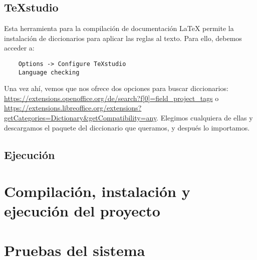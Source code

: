 \subsection{\TeX studio}
Esta herramienta para la compilación de documentación \LaTeX{} permite la instalación de diccionarios para aplicar las reglas al texto. Para ello, debemos acceder a:
\begin{lstlisting}
	Options -> Configure TeXstudio
	Language checking
\end{lstlisting}
Una vez ahí, vemos que nos ofrece dos opciones para buscar diccionarios: \url{https://extensions.openoffice.org/de/search?f[0]=field_project_tags} o \url{https://extensions.libreoffice.org/extensions?getCategories=Dictionary&getCompatibility=any}. Elegimos cualquiera de ellas y descargamos el paquete del diccionario que queramos, y después lo importamos.


\subsection{Ejecución}

\section{Compilación, instalación y ejecución del proyecto}


\section{Pruebas del sistema}
